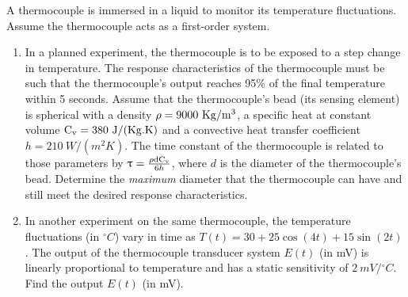 \documentclass[a4paper,11pt,dvipsnames]{book}
\begin{document}
\begin{question}
A thermocouple is immersed in a liquid to monitor its temperature fluctuations. Assume the thermocouple acts as a first-order system.
\begin{enumerate}
\item In a planned experiment, the thermocouple is to be exposed to a step change in temperature. The
response characteristics of the thermocouple must be such that the thermocouple’s output reaches 95\% of the final temperature within 5 seconds. Assume that the thermocouple’s bead (its sensing element) is spherical with  a density ${\rm \rho = 9000 ~Kg/m^3}$, a specific heat at constant volume ${\rm C_v = 380 ~J/(Kg.K)}$ and a convective heat transfer coefficient $h = 210 ~W/(m^2 K)$. The time constant of the thermocouple is related to those parameters by $\uptau = \frac{\rm \rho d C_v}{6h}$, where $d$ is the diameter of the thermocouple's bead. Determine the \emph{maximum} diameter that the
thermocouple can have and still meet the desired response characteristics.
\item In another experiment on the same thermocouple, the temperature fluctuations (in ${}^\circ C$) vary in time as $T(t) = 30 + 25\cos(4t) + 15\sin(2t)$. The output of the thermocouple transducer system $E(t)$ (in mV) is linearly proportional to temperature and has a static sensitivity of $2~ mV/{}^\circ C$. Find the output $E(t)$ (in mV).
\end{enumerate}
\end{question}
\end{document}
